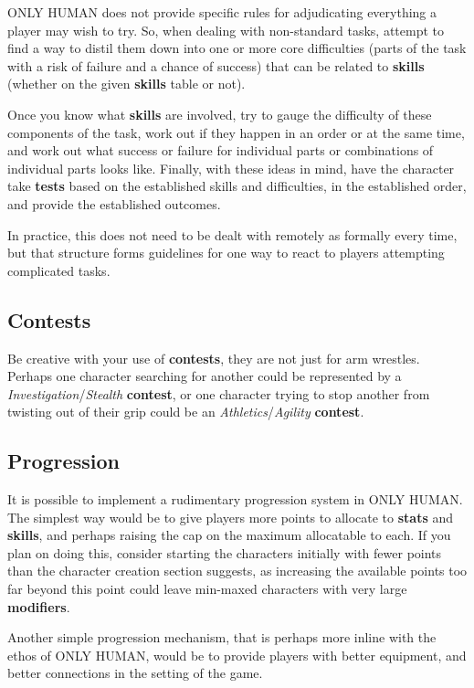 \documentclass[11pt]{article}
\begin{document}
\begin{multicols}{3}
  ONLY HUMAN does not provide specific rules for adjudicating everything a player may wish to try. So, when dealing with non-standard tasks, attempt to find a way to distil them down into one or more core difficulties (parts of the task with a risk of failure and a chance of success) that can be related to \textbf{skills} (whether on the given \textbf{skills} table or not).

  Once you know what \textbf{skills} are involved, try to gauge the difficulty of these components of the task, work out if they happen in an order or at the same time, and work out what success or failure for individual parts or combinations of individual parts looks like. Finally, with these ideas in mind, have the character take \textbf{tests} based on the established skills and difficulties, in the established order, and provide the established outcomes.

  In practice, this does not need to be dealt with remotely as formally every time, but that structure forms guidelines for one way to react to players attempting complicated tasks.

  \subsection*{Contests}

  Be creative with your use of \textbf{contests}, they are not just for arm wrestles. Perhaps one character searching for another could be represented by a \textit{Investigation}/\textit{Stealth} \textbf{contest}, or one character trying to stop another from twisting out of their grip could be an \textit{Athletics}/\textit{Agility} \textbf{contest}.

  \subsection*{Progression}

  It is possible to implement a rudimentary progression system in ONLY HUMAN. The simplest way would be to give players more points to allocate to \textbf{stats} and \textbf{skills}, and perhaps raising the cap on the maximum allocatable to each. If you plan on doing this, consider starting the characters initially with fewer points than the character creation section suggests, as increasing the available points too far beyond this point could leave min-maxed characters with very large \textbf{modifiers}.

  Another simple progression mechanism, that is perhaps more inline with the ethos of ONLY HUMAN, would be to provide players with better equipment, and better connections in the setting of the game.

\end{multicols}
\end{document}

